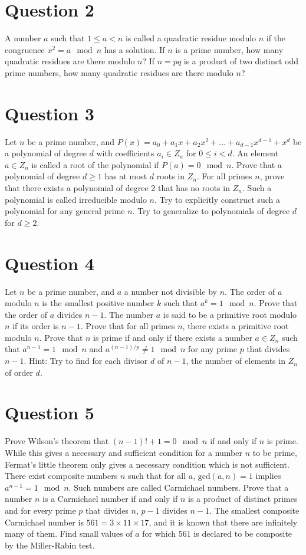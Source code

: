 \documentclass[12pt]{report}
\begin{document}
\section*{Question 2}
A number $a$ such that $1 \leq a < n$ is called a quadratic residue modulo $n$ if the congruence $x^2 = a \mod n$ has a solution. If $n$ is a prime number, how many quadratic residues are there modulo $n$? If $n = pq$ is a product of two distinct odd prime numbers, how many quadratic residues are there modulo $n$?

\section*{Question 3}
Let $n$ be a prime number, and $P(x) = a_0 + a_1x + a_2x^2 + \ldots + a_{d-1}x^{d-1} + x^d$ be a polynomial of degree $d$ with coefficients $a_i \in Z_n$ for $0 \leq i < d$. An element $a \in Z_n$ is called a root of the polynomial if $P(a) = 0 \mod n$. Prove that a polynomial of degree $d \geq 1$ has at most $d$ roots in $Z_n$. For all primes $n$, prove that there exists a polynomial of degree $2$ that has no roots in $Z_n$. Such a polynomial is called irreducible modulo $n$. Try to explicitly construct such a polynomial for any general prime $n$. Try to generalize to polynomials of degree $d$ for $d \geq 2$.

\section*{Question 4}
Let $n$ be a prime number, and $a$ a number not divisible by $n$. The order of $a$ modulo $n$ is the smallest positive number $k$ such that $a^k = 1 \mod n$. Prove that the order of $a$ divides $n - 1$. The number $a$ is said to be a primitive root modulo $n$ if its order is $n - 1$. Prove that for all primes $n$, there exists a primitive root modulo $n$. Prove that $n$ is prime if and only if there exists a number $a \in Z_n$ such that $a^{n-1} = 1 \mod n$ and $a^{(n-1)/p} \not= 1 \mod n$ for any prime $p$ that divides $n - 1$. Hint: Try to find for each divisor $d$ of $n - 1$, the number of elements in $Z_n$ of order $d$.

\section*{Question 5}
Prove Wilson's theorem that $(n - 1)! + 1 = 0 \mod n$ if and only if $n$ is prime. While this gives a necessary and sufficient condition for a number $n$ to be prime, Fermat’s little theorem only gives a necessary condition which is not sufficient. There exist composite numbers $n$ such that for all $a$, $\text{gcd}(a, n) = 1$ implies $a^{n-1} = 1 \mod n$. Such numbers are called Carmichael numbers. Prove that a number $n$ is a Carmichael number if and only if $n$ is a product of distinct primes and for every prime $p$ that divides $n$, $p - 1$ divides $n - 1$. The smallest composite Carmichael number is $561 = 3 \times 11 \times 17$, and it is known that there are infinitely many of them. Find small values of $a$ for which $561$ is declared to be composite by the Miller-Rabin test.
\end{document}
